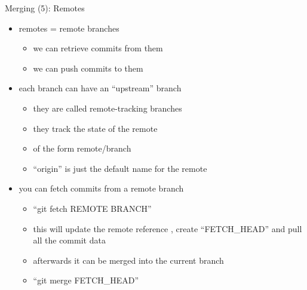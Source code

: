 \begin{frame}[fragile]{Merging (5): Remotes}
  \begin{itemize}
    
    \item remotes = remote branches
    \begin{itemize}
      \item we can retrieve commits from them
      \item we can push commits to them
    \end{itemize}
    
    \item each branch can have an ``upstream'' branch
    \begin{itemize}
      \item they are called remote-tracking branches
      \item they track the state of the remote
      \item of the form remote/branch
      \item ``origin'' is just the default name for the remote
    \end{itemize}
    
    \item you can fetch commits from a remote branch
    \begin{itemize}
      \item ``git fetch REMOTE BRANCH''
      \item this will update the remote reference , create ``FETCH\_HEAD'' and pull all the commit data
      \item afterwards it can be merged into the current branch
      \item ``git merge FETCH\_HEAD''
    \end{itemize}
  \end{itemize}
\end{frame}


